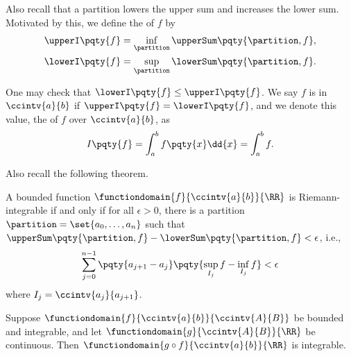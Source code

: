 Also recall that  a partition lowers the upper sum and increases the lower sum. Motivated by this, we define the  of \(f\) by
\begin{align*}
    \upperI \pqty{f} = \inf_{\partition} \upperSum\pqty{\partition, f}, \\
    \lowerI \pqty{f} = \sup_{\partition} \lowerSum\pqty{\partition, f}. \\
\end{align*}

One may check that \(\lowerI \pqty{f} \leq \upperI \pqty{f}\). We say \(f\) is  in \(\ccintv{a}{b}\) if \(\upperI\pqty{f} = \lowerI\pqty{f}\), and we denote this value, the  of \(f\) over \(\ccintv{a}{b}\), as
\[
    I\pqty{f} = \int_{a}^{b} f\pqty{x} \dd{x} = \int_{a}^{b} f.
\]

Also recall the following theorem.

\begin{theorem}
    A bounded function \(\functiondomain{f}{\ccintv{a}{b}}{\RR}\) is Riemann-integrable if and only if for all \(\epsilon > 0\), there is a partition \(\partition = \set{a_0, \ldots, a_n}\) such that \(\upperSum\pqty{\partition, f} - \lowerSum\pqty{\partition, f} < \epsilon\),
    i.e.,
    \[
        \sum_{j = 0}^{n - 1} \pqty{a_{j + 1} - a_j} \pqty{\sup_{I_j} f - \inf_{I_j} f} < \epsilon  
    \]
    where \(I_j = \ccintv{a_j}{a_{j + 1}}\).
\end{theorem}

\begin{theorem}
    Suppose \(\functiondomain{f}{\ccintv{a}{b}}{\ccintv{A}{B}}\) be bounded and integrable, and let \(\functiondomain{g}{\ccintv{A}{B}}{\RR}\) be continuous. Then \(\functiondomain{g \circ f}{\ccintv{a}{b}}{\RR}\) is integrable.
\end{theorem}


